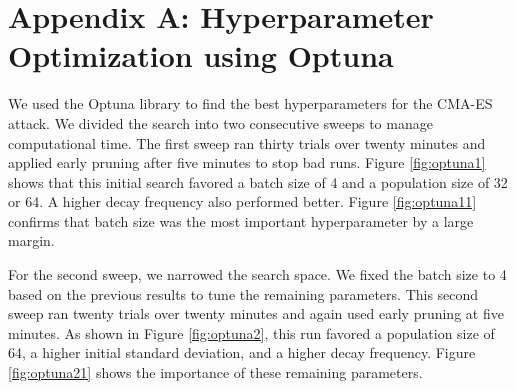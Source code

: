 \documentclass{article}
\begin{document}
\appendix
\section*{Appendix A: Hyperparameter Optimization using Optuna}
\label{appendix:a}

We used the Optuna library to find the best hyperparameters for the CMA-ES attack. We divided the search into two consecutive 
sweeps to manage computational time. The first sweep ran thirty trials over twenty minutes and applied early pruning after five 
minutes to stop bad runs. Figure \ref{fig:optuna1} shows that this initial search favored a batch size of 4 and a population 
size of 32 or 64. A higher decay frequency also performed better. Figure \ref{fig:optuna11} confirms that batch size was the most 
important hyperparameter by a large margin.

For the second sweep, we narrowed the search space. We fixed the batch size to 4 based on the previous results to tune the remaining 
parameters. This second sweep ran twenty trials over twenty minutes and again used early pruning at five minutes. As shown in 
Figure \ref{fig:optuna2}, this run favored a population size of 64, a higher initial standard deviation, and a higher decay frequency. 
Figure \ref{fig:optuna21} shows the importance of these remaining parameters.

\end{document}
